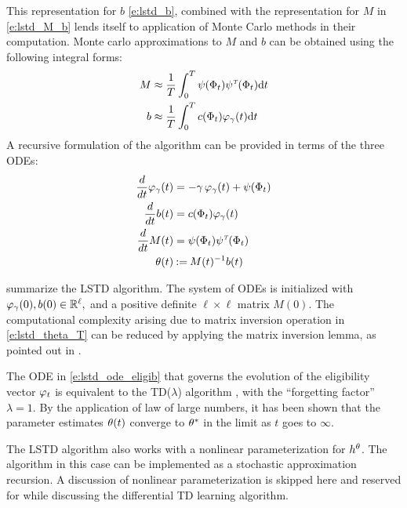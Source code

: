 This representation for $b$ \eqref{e:lstd_b}, combined with the representation for $M$ in \eqref{e:lstd_M_b} lends itself to application of Monte Carlo methods in their computation. Monte carlo approximations to $M$ and $b$ can be obtained using the following integral forms:
\begin{subequations}
\begin{align}
M &\approx \frac{1}{T} \int_0^T  \basis(\markovstate_t) \basis^\transpose(\markovstate_t) \ud t
\label{e:lstd_M_T}
\\
b & \approx  \frac{1}{T} \int_0^T c(\markovstate_t) \eligibvector_\discount(t) \ud t
\label{e:lstd_b_T}
\end{align}
\end{subequations}
A recursive formulation of the algorithm can be provided in terms of the three ODEs:
\begin{subequations}
\begin{align}
\ddt \eligibvector_\discount (t) &= - \discount\, \eligibvector_\discount(t) + \basis (\markovstate_t) 
\label{e:lstd_ode_eligib} \\
\ddt b(t) &=  c(\markovstate_t)\eligibvector_\discount(t)
 \label{e:lstd_ode_b}\\
\ddt M(t) &= \basis(\markovstate_t) \basis^\transpose(\markovstate_t) 
\label{e:lstd_ode_M} \\
\param(t) &\eqdef  M(t)^{-1} b(t)
\label{e:lstd_theta_T}
\end{align}
\end{subequations}

 summarize the LSTD algorithm. The system of ODEs is initialized with $\varphi_\gamma(0), b(0) \in \mathbb{R}^\ell,$ and a positive definite $\ell \times \ell$ matrix $M(0)$. The computational complexity arising due to matrix inversion operation in \eqref{e:lstd_theta_T} can be reduced by applying the matrix inversion lemma, as pointed out in \cite{ctcn}. 

The ODE in \eqref{e:lstd_ode_eligib} that governs the evolution of the eligibility vector $\varphi_t$ is equivalent to the TD($\lambda$) algorithm \cite{sut88}, with the ``forgetting factor'' $\lambda = 1$. By the application of law of large numbers, it has been shown that the parameter estimates $\theta(t)$ converge to $\theta^*$ in the limit as $t$ goes to $\infty$. %

The LSTD algorithm also works with a nonlinear parameterization for $h^\theta$. The algorithm in this case can be implemented as a stochastic approximation recursion. A discussion of nonlinear parameterization is skipped here and reserved for  while discussing the differential TD learning algorithm. 

